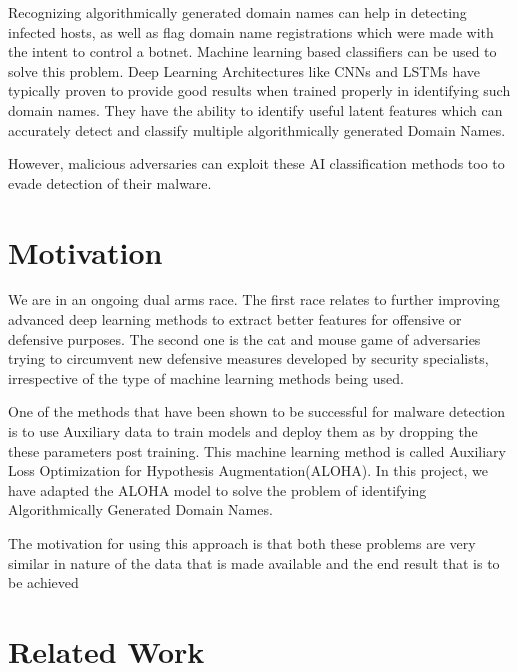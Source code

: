 \documentclass[conference]{IEEEtran}
\begin{document}
Recognizing algorithmically generated domain names can help in detecting infected hosts, as well as flag domain name registrations which were made with the intent to control a botnet. Machine learning based classifiers can be used to solve this problem. Deep Learning Architectures like CNNs and LSTMs have typically proven to provide good results when trained properly in identifying such domain names. They have the ability to identify useful latent features which can accurately detect and classify multiple algorithmically generated Domain Names.  

However, malicious adversaries can exploit these AI classification methods too to evade detection of their malware.

\section{Motivation}
We are in an ongoing dual arms race. The first race relates to further improving advanced deep learning methods to extract better features for offensive or defensive purposes. The second one
is the cat and mouse game of adversaries trying to circumvent new defensive measures developed by security specialists, irrespective of the type of machine learning methods being used.

One of the methods that have been shown to be successful for malware detection is to use Auxiliary data to train models and deploy them as by dropping the these parameters post training. This machine learning method is called Auxiliary Loss Optimization for Hypothesis Augmentation(ALOHA). In this project, we have adapted the ALOHA model to solve the problem of identifying Algorithmically Generated Domain Names. 

The motivation for using this approach is that both these problems are very similar in nature of the data that is made available and the end result that is to be achieved
\section{Related Work}
\end{document}
